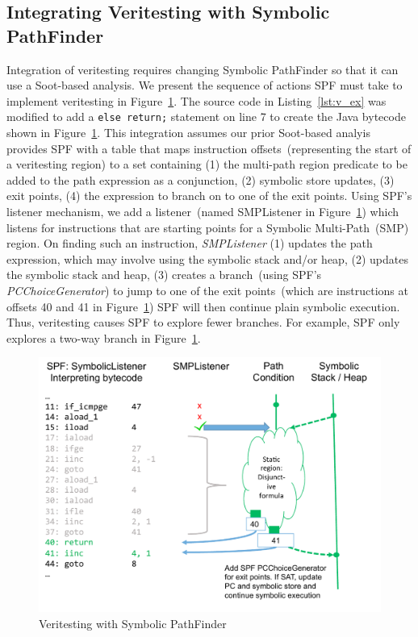 \subsection{Integrating Veritesting with Symbolic PathFinder}
%
Integration of veritesting requires changing Symbolic PathFinder so that it can 
use a Soot-based analysis.
%
We present the sequence of actions SPF must take to implement veritesting in 
Figure~\ref{fig:spf_veritesting}.
%
The source code in Listing~\ref{lst:v_ex} was modified to add a {\tt else return;} 
statement on line 7 to create the Java bytecode shown in Figure~\ref{fig:spf_veritesting}. 
%
This integration assumes our prior Soot-based analyis provides SPF 
with a table that maps instruction offsets~(representing the start of a 
veritesting region) to a set containing (1) the multi-path region predicate to be 
added to the path expression as a conjunction, (2) symbolic store
updates, (3) exit points, (4) the expression to branch on to one of the exit points.
%
Using SPF\rq s listener mechanism, we add a listener~(named SMPListener in Figure~\ref{fig:spf_veritesting}) which listens for instructions that are starting points for a Symbolic Multi-Path~(SMP) region.
%
On finding such an instruction, \textit{SMPListener} 
(1) updates the path expression, which may involve using the symbolic stack and/or heap, 
(2) updates the symbolic stack and heap, 
(3) creates a branch~(using SPF's \textit{PCChoiceGenerator}) to 
jump to one of the exit points~(which are instructions at offsets 40 and
41 in Figure~\ref{fig:spf_veritesting})
%
SPF will then continue plain symbolic execution.
%
Thus, veritesting causes SPF to explore fewer branches.
%
For example, SPF only explores a two-way branch in Figure~\ref{fig:spf_veritesting}.
%
\begin{figure}[]
\caption{Veritesting with Symbolic PathFinder}
\label{fig:spf_veritesting}
\includegraphics[width=\columnwidth]{figures/spf_veritesting}
\end{figure}


